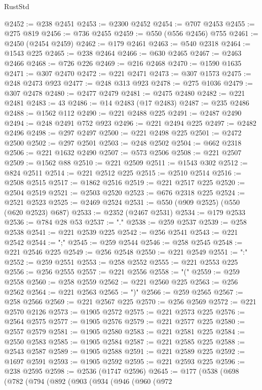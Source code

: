 \begin{lexlean}{RustStd}
\begin{coremodule}
@2452 := @238 @2451
@2453 := @2300 @2452
@2454 := @707 @2453
@2455 := @275 @819
@2456 := @736 @2455
@2459 := @550 (@556 @2456) @755
@2461 := @2450 (@2454 @2459)
@2462 := @179 @2461
@2463 := @540 @2318
@2464 := @1543 @225
@2465 := @238 @2464
@2466 := @630 @2465
@2467 := @2463 @2466
@2468 := @726 @226
@2469 := @216 @2468
@2470 := @1590 @1635
@2471 := @307 @2470
@2472 := @221 @2471
@2473 := @307 @1573
@2475 := @248 @2473 @923
@2477 := @248 @313 @923
@2478 := @275 @1036
@2479 := @307 @2478
@2480 := @2477 @2479
@2481 := @2475 @2480
@2482 := @221 @2481
@2483 := 43
@2486 := @14 @2483 (@17 @2483)
@2487 := @235 @2486
@2488 := @1562 @112
@2490 := @221 @2488 @225
@2491 := @2487 @2490
@2494 := @248 @2491 @752 @923
@2496 := @221 @2494 @225
@2497 := @2482 @2496
@2498 := @297 @2497
@2500 := @221 @2498 @225
@2501 := @2472 @2500
@2502 := @297 @2501
@2503 := @248 @2502
@2504 := @662 @2318
@2506 := @221 @1632 @2490
@2507 := @573 @2506
@2508 := @221 @2507
@2509 := @1562 @88
@2510 := @221 @2509
@2511 := @1543 @302
@2512 := @824 @2511
@2514 := @221 @2512 @225
@2515 := @2510 @2514
@2516 := @2508 @2515
@2517 := @1862 @2516
@2519 := @221 @2517 @225
@2520 := @2504 @2519
@2521 := @2503 @2520
@2523 := @676 @2318 @225
@2524 := @2521 @2523
@2525 := @2469 @2524
@2531 := @550 (@909 @2525) (@550 (@620 @2523) @687)
@2533 := @2352 (@2467 @2531)
@2534 := @179 @2533
@2536 := @784 @28 @53
@2537 := "."
@2538 := @259 @2537
@2539 := @258 @2538
@2541 := @221 @2539 @225
@2542 := @256 @2541
@2543 := @221 @2542
@2544 := ";"
@2545 := @259 @2544
@2546 := @258 @2545
@2548 := @221 @2546 @225
@2549 := @256 @2548
@2550 := @221 @2549
@2551 := ":"
@2552 := @259 @2551
@2553 := @258 @2552
@2555 := @221 @2553 @225
@2556 := @256 @2555
@2557 := @221 @2556
@2558 := "("
@2559 := @259 @2558
@2560 := @258 @2559
@2562 := @221 @2560 @225
@2563 := @256 @2562
@2564 := @221 @2563
@2565 := ")"
@2566 := @259 @2565
@2567 := @258 @2566
@2569 := @221 @2567 @225
@2570 := @256 @2569
@2572 := @221 @2570 @2126
@2573 := @1905 @2572
@2575 := @221 @2573 @225
@2576 := @2564 @2575
@2577 := @1905 @2576
@2579 := @221 @2577 @225
@2580 := @2557 @2579
@2581 := @1905 @2580
@2583 := @221 @2581 @225
@2584 := @2550 @2583
@2585 := @1905 @2584
@2587 := @221 @2585 @225
@2588 := @2543 @2587
@2589 := @1905 @2588
@2591 := @221 @2589 @225
@2592 := @1697 @2591
@2593 := @1905 @2592
@2595 := @221 @2593 @225
@2596 := @238 @2595
@2598 := @2536 (@1747 @2596)
@2645 := @177
    (@538
      (@698
        (@782
          (@794
            (@892
              (@903
                (@934
                  (@946
                    (@960
                      (@972

\end{coremodule}
\end{lexlean}
